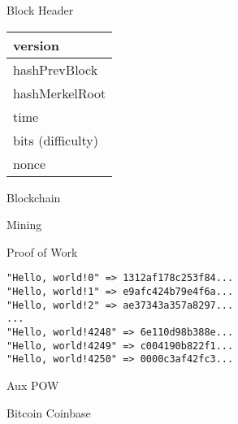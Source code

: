 \documentclass{beamer}
\begin{document}
\begin{frame}

    {\Huge Block Header}\\

    \vspace{5mm}

    \begin{tabular}{|l|}
    \hline
    version \\
    \hline
    hashPrevBlock \\
    \hline
    hashMerkelRoot \\
    \hline
    time \\
    \hline
    bits (difficulty)\\
    \hline
    nonce \\
    \hline
    \end{tabular}

\end{frame}

\begin{frame}

    {\Huge Blockchain}\\

\end{frame}

\begin{frame}

    {\Huge Mining}\\

\end{frame}

\begin{frame}[fragile]

    {\Huge Proof of Work}\\

    \begin{verbatim}
"Hello, world!0" => 1312af178c253f84...
"Hello, world!1" => e9afc424b79e4f6a...
"Hello, world!2" => ae37343a357a8297...
...
"Hello, world!4248" => 6e110d98b388e...
"Hello, world!4249" => c004190b822f1...
"Hello, world!4250" => 0000c3af42fc3...
    \end{verbatim}

\end{frame}

\begin{frame}

    {\Huge Aux POW}\\

\end{frame}

\begin{frame}

    {\Huge Bitcoin Coinbase}\\

\end{frame}
\end{document}
